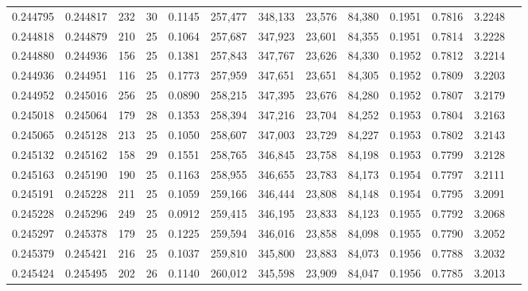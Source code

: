 \begin{tabular}{rrrrrrrrrrrrr}
0.244795 & 0.244817 &   232 &  30 &                                     0.1145 & 257,477 & 348,133 &  23,576 &  84,380 & 0.1951 & 0.7816 & 3.2248 \\
0.244818 & 0.244879 &   210 &  25 &                                     0.1064 & 257,687 & 347,923 &  23,601 &  84,355 & 0.1951 & 0.7814 & 3.2228 \\
0.244880 & 0.244936 &   156 &  25 &                                     0.1381 & 257,843 & 347,767 &  23,626 &  84,330 & 0.1952 & 0.7812 & 3.2214 \\
0.244936 & 0.244951 &   116 &  25 &                                     0.1773 & 257,959 & 347,651 &  23,651 &  84,305 & 0.1952 & 0.7809 & 3.2203 \\
0.244952 & 0.245016 &   256 &  25 &                                     0.0890 & 258,215 & 347,395 &  23,676 &  84,280 & 0.1952 & 0.7807 & 3.2179 \\
0.245018 & 0.245064 &   179 &  28 &                                     0.1353 & 258,394 & 347,216 &  23,704 &  84,252 & 0.1953 & 0.7804 & 3.2163 \\
0.245065 & 0.245128 &   213 &  25 &                                     0.1050 & 258,607 & 347,003 &  23,729 &  84,227 & 0.1953 & 0.7802 & 3.2143 \\
0.245132 & 0.245162 &   158 &  29 &                                     0.1551 & 258,765 & 346,845 &  23,758 &  84,198 & 0.1953 & 0.7799 & 3.2128 \\
0.245163 & 0.245190 &   190 &  25 &                                     0.1163 & 258,955 & 346,655 &  23,783 &  84,173 & 0.1954 & 0.7797 & 3.2111 \\
0.245191 & 0.245228 &   211 &  25 &                                     0.1059 & 259,166 & 346,444 &  23,808 &  84,148 & 0.1954 & 0.7795 & 3.2091 \\
0.245228 & 0.245296 &   249 &  25 &                                     0.0912 & 259,415 & 346,195 &  23,833 &  84,123 & 0.1955 & 0.7792 & 3.2068 \\
0.245297 & 0.245378 &   179 &  25 &                                     0.1225 & 259,594 & 346,016 &  23,858 &  84,098 & 0.1955 & 0.7790 & 3.2052 \\
0.245379 & 0.245421 &   216 &  25 &                                     0.1037 & 259,810 & 345,800 &  23,883 &  84,073 & 0.1956 & 0.7788 & 3.2032 \\
0.245424 & 0.245495 &   202 &  26 &                                     0.1140 & 260,012 & 345,598 &  23,909 &  84,047 & 0.1956 & 0.7785 & 3.2013 \\

\end{tabular}
